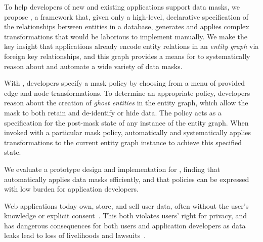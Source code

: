 To help developers of new and existing applications support data masks, we propose
\sys, a framework that, given only a high-level, declarative specification of the relationships
between entities in a database, generates and applies complex transformations that would be
laborious to implement manually. We make the key insight that applications already encode entity
relations in an \emph{entity graph} via foreign key relationships, and this graph provides a means
for \sys to systematically reason about and automate a wide variety of data masks.

With \sys, developers specify a mask policy by choosing from a menu of provided edge and node
transformations. To determine an appropriate policy, developers reason about the creation of
\emph{ghost entities} in the entity graph, which allow the mask to both retain and de-identify or
hide data.  The policy acts as a specification for the post-mask state of any instance of the entity
graph. When invoked with a particular mask policy, \sys automatically and systematically applies
transformations to the current entity graph instance to achieve this specified state.

We evaluate a prototype design and implementation for \sys, finding that \sys automatically applies
data masks efficiently, and that policies can be expressed with low burden for application
developers.

\iffalse
%
%
Web applications today own, store, and sell user data, often without the user's knowledge or
explicit consent~\cite{nytimes:fb, npr:data}. This both violates users' right for privacy, and has
dangerous consequences for both users and application developers as data leaks lead to loss of
livelihoods and lawsuits~\cite{breach:amazon,breach:twitter, breach:fb, breach:marriott,
breach:quora}. 

